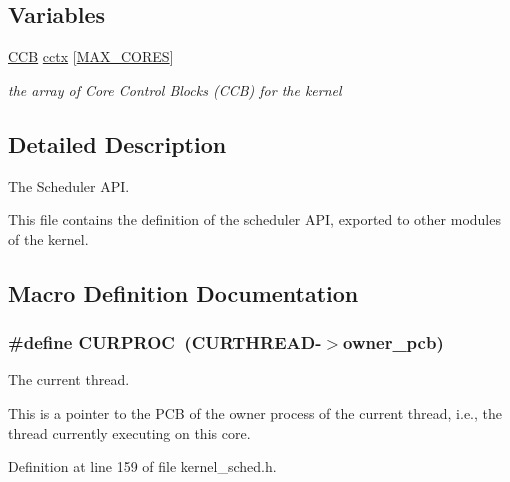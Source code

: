 \subsection*{Variables}
\begin{DoxyCompactItemize}
\item 
\hyperlink{group__scheduler_ga7485b31e0dd9fd723bc2d75fba5206a0}{C\+CB} \hyperlink{group__scheduler_ga3be3b151b275926dff3fb99bee765eab}{cctx} \mbox{[}\hyperlink{bios_8h_a009855593b59738d24dbfc236edb3b14}{M\+A\+X\+\_\+\+C\+O\+R\+ES}\mbox{]}\hypertarget{group__scheduler_ga3be3b151b275926dff3fb99bee765eab}{}\label{group__scheduler_ga3be3b151b275926dff3fb99bee765eab}

\begin{DoxyCompactList}\small\item\em the array of Core Control Blocks (C\+CB) for the kernel \end{DoxyCompactList}\end{DoxyCompactItemize}


\subsection{Detailed Description}
The Scheduler A\+PI. 

This file contains the definition of the scheduler A\+PI, exported to other modules of the kernel. 

\subsection{Macro Definition Documentation}
\subsubsection[{\texorpdfstring{C\+U\+R\+P\+R\+OC}{CURPROC}}]{\setlength{\rightskip}{0pt plus 5cm}\#define C\+U\+R\+P\+R\+OC~({\bf C\+U\+R\+T\+H\+R\+E\+AD}-\/$>$owner\+\_\+pcb)}\hypertarget{group__scheduler_gae3437e8e6787ef05b6576d03c5b6a0ca}{}\label{group__scheduler_gae3437e8e6787ef05b6576d03c5b6a0ca}


The current thread. 

This is a pointer to the P\+CB of the owner process of the current thread, i.\+e., the thread currently executing on this core. 

Definition at line 159 of file kernel\+\_\+sched.\+h.

